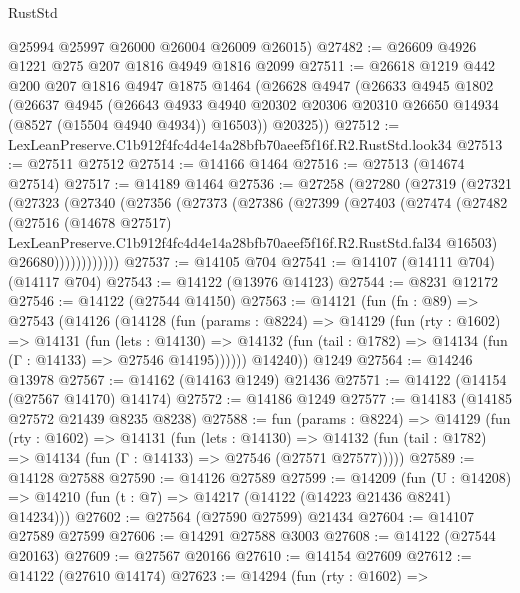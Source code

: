 \begin{lexlean}{RustStd}
\begin{coremodule}
      @25994
      @25997
      @26000
      @26004
      @26009
      @26015)
@27482 := @26609 @4926 @1221 @275 @207 @1816 @4949 @1816 @2099
@27511 := @26618
    @1219
    @442
    @200
    @207
    @1816
    @4947
    @1875
    @1464
    (@26628
      @4947
      (@26633
        @4945
        @1802
        (@26637
          @4945
          (@26643
            @4933
            @4940
            @20302
            @20306
            @20310
            @26650
            @14934
            (@8527 (@15504 @4940 @4934))
            @16503))
        @20325))
@27512 := LexLeanPreserve.C1b912f4fc4d4e14a28bfb70aeef5f16f.R2.RustStd.look34
@27513 := @27511 @27512
@27514 := @14166 @1464
@27516 := @27513 (@14674 @27514)
@27517 := @14189 @1464
@27536 := @27258
    (@27280
      (@27319
        (@27321
          (@27323
            (@27340
              (@27356
                (@27373
                  (@27386
                    (@27399
                      (@27403
                        (@27474
                          (@27482
                            (@27516
                              (@14678 @27517)
                              LexLeanPreserve.C1b912f4fc4d4e14a28bfb70aeef5f16f.R2.RustStd.fal34
                              @16503)
                            @26680))))))))))))
@27537 := @14105 @704
@27541 := @14107 (@14111 @704) (@14117 @704)
@27543 := @14122 (@13976 @14123)
@27544 := @8231 @12172
@27546 := @14122 (@27544 @14150)
@27563 := @14121
    (fun (fn : @89) =>
    @27543
      (@14126
        (@14128
          (fun (params : @8224) =>
          @14129
            (fun (rty : @1602) =>
            @14131
              (fun (lets : @14130) =>
              @14132 (fun (tail : @1782) => @14134 (fun (Γ : @14133) => @27546 @14195))))))
        @14240))
    @1249
@27564 := @14246 @13978
@27567 := @14162 (@14163 @1249) @21436
@27571 := @14122 (@14154 (@27567 @14170) @14174)
@27572 := @14186 @1249
@27577 := @14183 (@14185 @27572 @21439 @8235 @8238)
@27588 := fun (params : @8224) =>
  @14129
    (fun (rty : @1602) =>
    @14131
      (fun (lets : @14130) =>
      @14132 (fun (tail : @1782) => @14134 (fun (Γ : @14133) => @27546 (@27571 @27577)))))
@27589 := @14128 @27588
@27590 := @14126 @27589
@27599 := @14209
    (fun (U : @14208) => @14210 (fun (t : @7) => @14217 (@14122 (@14223 @21436 @8241) @14234)))
@27602 := @27564 (@27590 @27599) @21434
@27604 := @14107 @27589 @27599
@27606 := @14291 @27588 @3003
@27608 := @14122 (@27544 @20163)
@27609 := @27567 @20166
@27610 := @14154 @27609
@27612 := @14122 (@27610 @14174)
@27623 := @14294
    (fun (rty : @1602) =>

\end{coremodule}
\end{lexlean}
